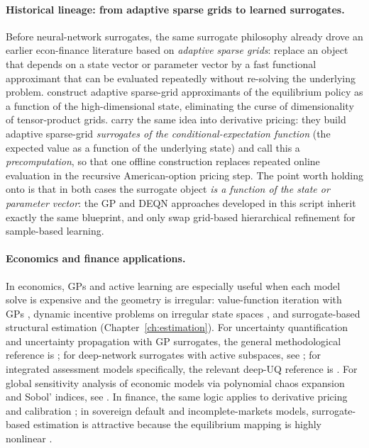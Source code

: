 \documentclass[11pt,a4paper]{report}
\begin{document}
\paragraph{Historical lineage: from adaptive sparse grids to learned surrogates.}  Before neural-network surrogates, the same surrogate philosophy already drove an earlier econ-finance literature based on \emph{adaptive sparse grids}: replace an object that depends on a state vector or parameter vector by a fast functional approximant that can be evaluated repeatedly without re-solving the underlying problem.  \citet{ECTA:ECTA1716} construct adaptive sparse-grid approximants of the equilibrium policy as a function of the high-dimensional state, eliminating the curse of dimensionality of tensor-product grids.  \citet{scheideggertreccani_2018} carry the same idea into derivative pricing: they build adaptive sparse-grid \emph{surrogates of the conditional-expectation function} (the expected value as a function of the underlying state) and call this a \emph{precomputation}, so that one offline construction replaces repeated online evaluation in the recursive American-option pricing step.  The point worth holding onto is that in both cases the surrogate object \emph{is a function of the state or parameter vector}: the GP and DEQN approaches developed in this script inherit exactly the same blueprint, and only swap grid-based hierarchical refinement for sample-based learning.

\paragraph{Economics and finance applications.}  In economics, GPs and active learning are especially useful when each model solve is expensive and the geometry is irregular: value-function iteration with GPs \citep{SCHEIDEGGER201968}, dynamic incentive problems on irregular state spaces \citep{rennerscheidegger_2018}, and surrogate-based structural estimation (Chapter~\ref{ch:estimation}).  For uncertainty quantification and uncertainty propagation with GP surrogates, the general methodological reference is \citet{Bilionis:2016wc}; for deep-network surrogates with active subspaces, see \citet{tripathy2018deep}; for integrated assessment models specifically, the relevant deep-UQ reference is \citet{friedlDeep2023}.  For global sensitivity analysis of economic models via polynomial chaos expansion and Sobol' indices, see \citet{harenberg2019uncertainty}.  In finance, the same logic applies to derivative pricing and calibration \citep{hutchinson1994nonparametric}; in sovereign default and incomplete-markets models, surrogate-based estimation is attractive because the equilibrium mapping is highly nonlinear \citep{arellano2008default}.
\end{document}
